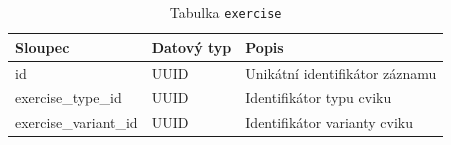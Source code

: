 \begin{table}[ht!]
    \centering
    \begin{tabularx}{\textwidth}{|l|l|L|}
        \hline
        \textbf{Sloupec}      & \textbf{Datový typ} & \textbf{Popis}                 \\ \hline
        id                    & UUID                & Unikátní identifikátor záznamu \\ \hline
        exercise\_type\_id    & UUID                & Identifikátor typu cviku       \\ \hline
        exercise\_variant\_id & UUID                & Identifikátor varianty cviku   \\ \hline
    \end{tabularx}
    \caption{Tabulka \texttt{exercise}}
    \label{tab:exercise}
\end{table}
